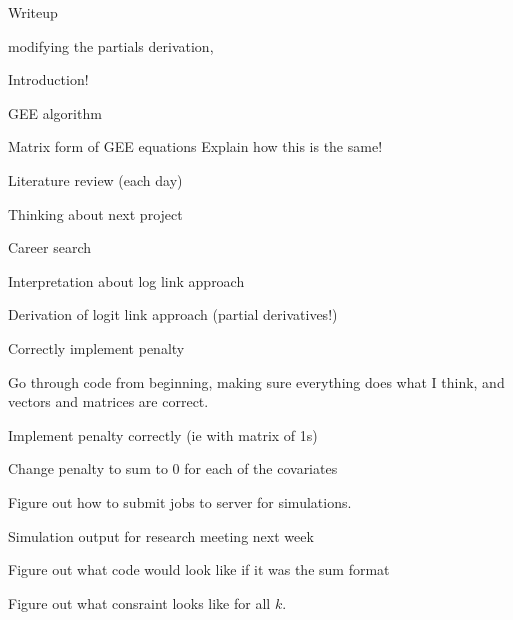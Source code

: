 \documentclass[10pt]{article}
\theoremstyle{definition}
\begin{document}
 \begin{todolist}
   \item Writeup
   \begin{todolist}
     \item  modifying the partials derivation,
     \item Introduction!
     \item GEE algorithm
     \item Matrix form of GEE equations Explain how this is the same!
   \end{todolist}
   \item Literature review (each day)
   \item Thinking about next project
   \item Career search
   \item Interpretation about log link approach
   \item Derivation of logit link approach (partial derivatives!)
   \item Correctly implement penalty
   \item Go through code from beginning, making sure everything does what I think, and vectors and matrices are correct.
   \item Implement penalty correctly (ie with matrix of 1s)
   \item Change penalty to sum to 0 for each of the covariates
   \item Figure out how to submit jobs to server for simulations.
   \item Simulation output for research meeting next week
   \item Figure out what code would look like if it was the sum format
   \item Figure out what consraint looks like for all $k$.
 \end{todolist}


 
\end{document}
